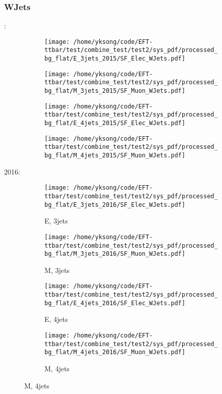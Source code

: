 \documentclass{beamer}
\begin{document}
\begin{frame}
\frametitle{WJets}
\fontsize{5}{1}:
\begin{figure}
\centering
\begin{subfigure}[b]{0.24\textwidth}
\texttt{[image: /home/yksong/code/EFT-ttbar/test/combine\_test/test2/sys\_pdf/processed\_bg\_flat/E\_3jets\_2015/SF\_Elec\_WJets.pdf]}
\end{subfigure}
\begin{subfigure}[b]{0.24\textwidth}
\texttt{[image: /home/yksong/code/EFT-ttbar/test/combine\_test/test2/sys\_pdf/processed\_bg\_flat/M\_3jets\_2015/SF\_Muon\_WJets.pdf]}
\end{subfigure}
\begin{subfigure}[b]{0.24\textwidth}
\texttt{[image: /home/yksong/code/EFT-ttbar/test/combine\_test/test2/sys\_pdf/processed\_bg\_flat/E\_4jets\_2015/SF\_Elec\_WJets.pdf]}
\end{subfigure}
\begin{subfigure}[b]{0.24\textwidth}
\texttt{[image: /home/yksong/code/EFT-ttbar/test/combine\_test/test2/sys\_pdf/processed\_bg\_flat/M\_4jets\_2015/SF\_Muon\_WJets.pdf]}
\end{subfigure}
\end{figure}
2016:
\begin{figure}
\centering
\begin{subfigure}[b]{0.24\textwidth}
\texttt{[image: /home/yksong/code/EFT-ttbar/test/combine\_test/test2/sys\_pdf/processed\_bg\_flat/E\_3jets\_2016/SF\_Elec\_WJets.pdf]}
\captionsetup{font=tiny}
\caption{E, 3jets}
\end{subfigure}
\begin{subfigure}[b]{0.24\textwidth}
\texttt{[image: /home/yksong/code/EFT-ttbar/test/combine\_test/test2/sys\_pdf/processed\_bg\_flat/M\_3jets\_2016/SF\_Muon\_WJets.pdf]}
\captionsetup{font=tiny}
\caption{M, 3jets}
\end{subfigure}
\begin{subfigure}[b]{0.24\textwidth}
\texttt{[image: /home/yksong/code/EFT-ttbar/test/combine\_test/test2/sys\_pdf/processed\_bg\_flat/E\_4jets\_2016/SF\_Elec\_WJets.pdf]}
\captionsetup{font=tiny}
\caption{E, 4jets}
\end{subfigure}
\begin{subfigure}[b]{0.24\textwidth}
\texttt{[image: /home/yksong/code/EFT-ttbar/test/combine\_test/test2/sys\_pdf/processed\_bg\_flat/M\_4jets\_2016/SF\_Muon\_WJets.pdf]}
\captionsetup{font=tiny}
\caption{M, 4jets}
\end{subfigure}
\end{figure}
\end{frame}
\end{document}
